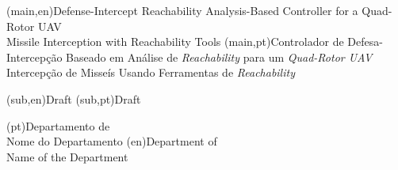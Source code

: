 
%




\nttitle(main,en){Defense-Intercept Reachability Analysis-Based Controller for a Quad-Rotor UAV\\
Missile Interception with Reachability Tools}%
\nttitle(main,pt){Controlador de Defesa-Intercepção Baseado em Análise de \textit{Reachability} para um \textit{Quad-Rotor UAV}\\
Intercepção de Misseís Usando Ferramentas de \textit{Reachability}}%

\nttitle(sub,en){Draft}%
\nttitle(sub,pt){Draft}%




\ntdepartment*(pt){Departamento de\\Nome do Departamento}
\ntdepartment*(en){Department of\\Name of the Department}



